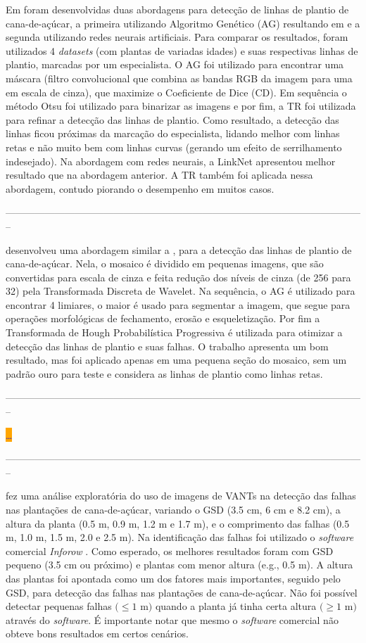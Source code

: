 \documentclass[12pt, a4paper, english, brazil]{article}
\newcommand{\dotsBlue}{\colorbox{orange}{\textcolor{blue}{\dots}}}
\newcommand{\linePage}{--------------------------------------------------------------------------------------------------------------}
\begin{document}
Em  foram desenvolvidas duas abordagens para detecção de linhas de plantio de cana-de-açúcar, a primeira utilizando Algoritmo Genético (AG) resultando em  e a segunda utilizando redes neurais artificiais. Para comparar os resultados, foram utilizados 4 \textit{datasets} (com plantas de variadas idades) e suas respectivas linhas de plantio, marcadas por um especialista. O AG foi utilizado para encontrar uma máscara (filtro convolucional que combina as bandas RGB da imagem para uma em escala de cinza), que maximize o Coeficiente de Dice (CD). Em sequência o método Otsu foi utilizado para binarizar as imagens e por fim, a TR foi utilizada para refinar a detecção das linhas de plantio. Como resultado, a detecção das linhas ficou próximas da marcação do especialista, lidando melhor com linhas retas e não muito bem com linhas curvas (gerando um efeito de serrilhamento indesejado). Na abordagem com redes neurais, a LinkNet apresentou melhor resultado que na abordagem anterior. A TR também foi aplicada nessa abordagem, contudo piorando o desempenho em muitos casos.

\linePage

 desenvolveu uma abordagem similar a , para a detecção das linhas de plantio de cana-de-açúcar. Nela, o mosaico é dividido em pequenas imagens, que são convertidas para escala de cinza e feita redução dos níveis de cinza (de 256 para 32) pela Transformada Discreta de Wavelet. Na sequência, o AG é utilizado para encontrar 4 limiares, o maior é usado para segmentar a imagem, que segue para operações morfológicas de fechamento, erosão e esqueletização. Por fim a Transformada de Hough Probabilística Progressiva é utilizada para otimizar a detecção das linhas de plantio e suas falhas. O trabalho apresenta um bom resultado, mas foi aplicado apenas em uma pequena seção do mosaico, sem um padrão ouro para teste e considera as linhas de plantio como linhas retas.

\linePage

 \dotsBlue

\linePage

 fez uma análise exploratória do uso de imagens de VANTs na detecção das falhas nas plantações de cana-de-açúcar, variando o GSD (3.5 cm, 6 cm e 8.2 cm), a altura da planta (0.5 m, 0.9 m, 1.2 m e 1.7 m), e o comprimento das falhas (0.5 m, 1.0 m, 1.5 m, 2.0 e 2.5 m). Na identificação das falhas foi utilizado o \textit{software} comercial \textit{Inforow} \cite{Inforow_2021}. Como esperado, os melhores resultados foram com GSD pequeno (3.5 cm ou próximo) e plantas com menor altura (e.g., 0.5 m). A altura das plantas foi apontada como um dos fatores mais importantes, seguido pelo GSD, para detecção das falhas nas plantações de cana-de-açúcar. Não foi possível detectar pequenas falhas $(\le 1$ m$)$ quando a planta já tinha certa altura $(\ge 1$ m$)$ através do \textit{software}. É importante notar que mesmo o \textit{software} comercial não obteve bons resultados em certos cenários.
\end{document}
